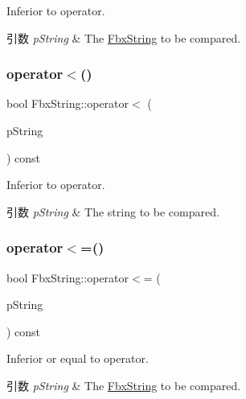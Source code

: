 Inferior to operator. 
\begin{DoxyParams}{引数}
{\em p\+String} & The \hyperlink{class_fbx_string}{Fbx\+String} to be compared. \\
\hline
\end{DoxyParams}
\mbox{\label{class_fbx_string_a690101be9e73d2296074a688646c9619}} 
\subsubsection{\texorpdfstring{operator$<$()}{operator<()}\hspace{0.1cm}{\footnotesize\ttfamily [2/2]}}
{\footnotesize\ttfamily bool Fbx\+String\+::operator$<$ (\begin{DoxyParamCaption}\item[{const char $\ast$}]{p\+String }\end{DoxyParamCaption}) const}

Inferior to operator. 
\begin{DoxyParams}{引数}
{\em p\+String} & The string to be compared. \\
\hline
\end{DoxyParams}
\mbox{\label{class_fbx_string_a6154ef9580e5cc38e8672f28834c6540}} 
\subsubsection{\texorpdfstring{operator$<$=()}{operator<=()}\hspace{0.1cm}{\footnotesize\ttfamily [1/2]}}
{\footnotesize\ttfamily bool Fbx\+String\+::operator$<$= (\begin{DoxyParamCaption}\item[{const \hyperlink{class_fbx_string}{Fbx\+String} \&}]{p\+String }\end{DoxyParamCaption}) const}

Inferior or equal to operator. 
\begin{DoxyParams}{引数}
{\em p\+String} & The \hyperlink{class_fbx_string}{Fbx\+String} to be compared. \\
\hline
\end{DoxyParams}
\mbox{\label{class_fbx_string_ab20ec27bf61855ed5906220fd4f9e4d4}} 
